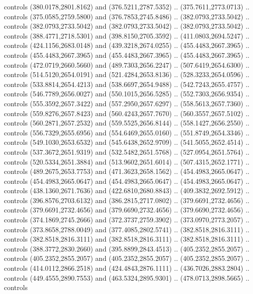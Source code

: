 \begin{scope}[shift={(296.85925,-6.26562)}]
\begin{scope}[shift={(-138.30846,-2572.6617)}]
\begin{scope}
        controls (380.0178,2801.8162) and (376.5211,2787.5352) .. (375.7611,2773.0713)
        .. controls (375.0585,2759.5800) and (376.7853,2745.8486) ..
        (382.0793,2733.5042) .. controls (382.0793,2733.5042) and (382.0793,2733.5042)
        .. (382.0793,2733.5042) .. controls (388.4771,2718.5301) and
        (398.8150,2705.3592) .. (411.0803,2694.5247) .. controls (424.1156,2683.0148)
        and (439.3218,2674.0255) .. (455.4483,2667.3965) .. controls
        (455.4483,2667.3965) and (455.4483,2667.3965) .. (455.4483,2667.3965) ..
        controls (472.0719,2660.5660) and (489.7303,2656.2247) .. (507.6419,2654.6300)
        .. controls (514.5120,2654.0191) and (521.4284,2653.8136) ..
        (528.3233,2654.0596) .. controls (533.8814,2654.4213) and (538.6697,2654.9488)
        .. (542.7243,2655.4757) .. controls (546.7789,2656.0027) and
        (550.1015,2656.5285) .. (552.7303,2656.9354) .. controls (555.3592,2657.3422)
        and (557.2950,2657.6297) .. (558.5613,2657.7360) .. controls
        (559.8276,2657.8423) and (560.4243,2657.7670) .. (560.3557,2657.5102) ..
        controls (560.2871,2657.2532) and (559.5525,2656.8144) .. (558.1427,2656.2550)
        .. controls (556.7329,2655.6956) and (554.6469,2655.0160) ..
        (551.8749,2654.3346) .. controls (549.1030,2653.6532) and (545.6438,2652.9709)
        .. (541.5055,2652.4514) .. controls (537.3672,2651.9319) and
        (532.5482,2651.5768) .. (527.0954,2651.5764) .. controls (520.5334,2651.3884)
        and (513.9602,2651.6014) .. (507.4315,2652.1771) .. controls
        (489.2675,2653.7753) and (471.3623,2658.1562) .. (454.4983,2665.0647) ..
        controls (454.4983,2665.0647) and (454.4983,2665.0647) .. (454.4983,2665.0647)
        .. controls (438.1360,2671.7636) and (422.6810,2680.8843) ..
        (409.3832,2692.5912) .. controls (396.8576,2703.6132) and (386.2815,2717.0802)
        .. (379.6691,2732.4656) .. controls (379.6691,2732.4656) and
        (379.6690,2732.4656) .. (379.6690,2732.4656) .. controls (374.1869,2745.2666)
        and (372.3737,2759.3902) .. (373.0970,2773.2057) .. controls
        (373.8658,2788.0049) and (377.4085,2802.5741) .. (382.8518,2816.3111) ..
        controls (382.8518,2816.3111) and (382.8518,2816.3111) .. (382.8518,2816.3111)
        .. controls (388.3772,2830.2660) and (395.8899,2843.4513) ..
        (405.2352,2855.2057) .. controls (405.2352,2855.2057) and (405.2352,2855.2057)
        .. (405.2352,2855.2057) .. controls (414.0112,2866.2518) and
        (424.4843,2876.1111) .. (436.7026,2883.2804) .. controls (449.4555,2890.7553)
        and (463.5324,2895.9301) .. (478.0713,2898.5665) .. controls

\end{scope}
\end{scope}
\end{scope}
